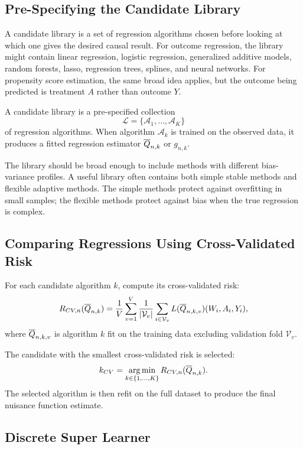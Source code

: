 \label{lec:5-5}

\subsection{Pre-Specifying the Candidate Library}

A candidate library is a set of regression algorithms chosen before looking at which
one gives the desired causal result. For outcome regression, the library might contain
linear regression, logistic regression, generalized additive models, random forests,
lasso, regression trees, splines, and neural networks. For propensity score estimation,
the same broad idea applies, but the outcome being predicted is treatment $A$ rather
than outcome $Y$.

\begin{definition}
A candidate library is a pre-specified collection
\[
\mathcal L=\{\mathcal A_1,\ldots,\mathcal A_K\}
\]
of regression algorithms. When algorithm $\mathcal A_k$ is trained on the observed
data, it produces a fitted regression estimator $\overline{Q}_{n,k}$ or $g_{n,k}$.
\end{definition}

The library should be broad enough to include methods with different bias-variance
profiles. A useful library often contains both simple stable methods and flexible
adaptive methods. The simple methods protect against overfitting in small samples;
the flexible methods protect against bias when the true regression is complex.

\subsection{Comparing Regressions Using Cross-Validated Risk}

For each candidate algorithm $k$, compute its cross-validated risk:
\[
R_{CV,n}(\overline{Q}_{n,k})
=
\frac{1}{V}\sum_{v=1}^V
\frac{1}{|\mathcal V_v|}
\sum_{i\in\mathcal V_v}
L(\overline{Q}_{n,k,v})(W_i,A_i,Y_i),
\]
where $\overline{Q}_{n,k,v}$ is algorithm $k$ fit on the training data excluding validation
fold $\mathcal V_v$.

The candidate with the smallest cross-validated risk is selected:
\[
k_{CV}
=
\operatorname*{arg\,min}_{k\in\{1,\ldots,K\}}
R_{CV,n}(\overline{Q}_{n,k}).
\]
The selected algorithm is then refit on the full dataset to produce the final nuisance
function estimate.

\subsection{Discrete Super Learner}

